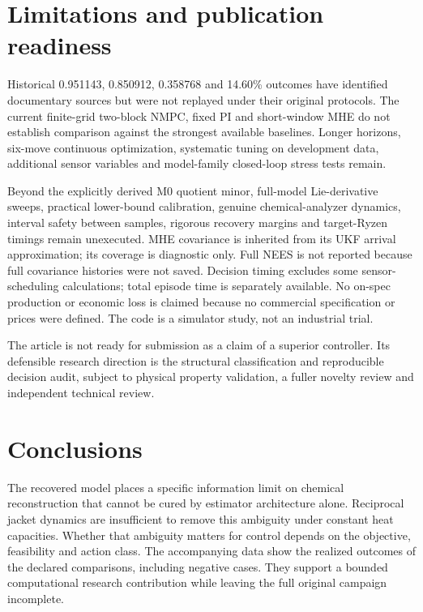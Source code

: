 \documentclass[
  11pt,
]{article}
\begin{document}
\hypertarget{limitations-and-publication-readiness}{%
\section{Limitations and publication
readiness}\label{limitations-and-publication-readiness}}

Historical 0.951143, 0.850912, 0.358768 and 14.60\% outcomes have
identified documentary sources but were not replayed under their
original protocols. The current finite-grid two-block NMPC, fixed PI and
short-window MHE do not establish comparison against the strongest
available baselines. Longer horizons, six-move continuous optimization,
systematic tuning on development data, additional sensor variables and
model-family closed-loop stress tests remain.

Beyond the explicitly derived M0 quotient minor, full-model
Lie-derivative sweeps, practical lower-bound calibration, genuine
chemical-analyzer dynamics, interval safety between samples, rigorous
recovery margins and target-Ryzen timings remain unexecuted. MHE
covariance is inherited from its UKF arrival approximation; its coverage
is diagnostic only. Full NEES is not reported because full covariance
histories were not saved. Decision timing excludes some
sensor-scheduling calculations; total episode time is separately
available. No on-spec production or economic loss is claimed because no
commercial specification or prices were defined. The code is a simulator
study, not an industrial trial.

The article is not ready for submission as a claim of a superior
controller. Its defensible research direction is the structural
classification and reproducible decision audit, subject to physical
property validation, a fuller novelty review and independent technical
review.

\hypertarget{conclusions}{%
\section{Conclusions}\label{conclusions}}

The recovered model places a specific information limit on chemical
reconstruction that cannot be cured by estimator architecture alone.
Reciprocal jacket dynamics are insufficient to remove this ambiguity
under constant heat capacities. Whether that ambiguity matters for
control depends on the objective, feasibility and action class. The
accompanying data show the realized outcomes of the declared
comparisons, including negative cases. They support a bounded
computational research contribution while leaving the full original
campaign incomplete.
\end{document}
